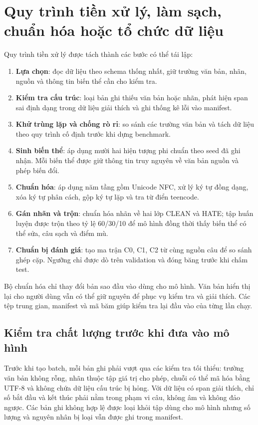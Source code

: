 \documentclass[12pt,a4paper]{article}
\begin{document}
\section{Quy trình tiền xử lý, làm sạch, chuẩn hóa hoặc tổ chức dữ liệu}
Quy trình tiền xử lý được tách thành các bước có thể tái lập:
\begin{enumerate}
  \item \textbf{Lựa chọn}: đọc dữ liệu theo schema thống nhất, giữ trường văn bản, nhãn, nguồn và thông tin biến thể cần cho kiểm tra.
  \item \textbf{Kiểm tra cấu trúc}: loại bản ghi thiếu văn bản hoặc nhãn, phát hiện span sai định dạng trong dữ liệu giải thích và ghi thống kê lỗi vào manifest.
  \item \textbf{Khử trùng lặp và chống rò rỉ}: so sánh các trường văn bản và tách dữ liệu theo quy trình cố định trước khi dựng benchmark.
  \item \textbf{Sinh biến thể}: áp dụng mười hai hiện tượng phi chuẩn theo seed đã ghi nhận. Mỗi biến thể được giữ thông tin truy nguyên về văn bản nguồn và phép biến đổi.
  \item \textbf{Chuẩn hóa}: áp dụng năm tầng gồm Unicode NFC, xử lý ký tự đồng dạng, xóa ký tự phân cách, gộp ký tự lặp và tra từ điển teencode.
  \item \textbf{Gán nhãn và trộn}: chuẩn hóa nhãn về hai lớp CLEAN và HATE; tập huấn luyện được trộn theo tỷ lệ 60/30/10 để mô hình đồng thời thấy biến thể có thể sửa, câu sạch và điểm mù.
  \item \textbf{Chuẩn bị đánh giá}: tạo ma trận C0, C1, C2 từ cùng nguồn câu để so sánh ghép cặp. Ngưỡng chỉ được dò trên validation và đóng băng trước khi chấm test.
\end{enumerate}

Bộ chuẩn hóa chỉ thay đổi bản sao đầu vào dùng cho mô hình. Văn bản hiển thị lại cho người dùng vẫn có thể giữ nguyên để phục vụ kiểm tra và giải thích. Các tệp trung gian, manifest và mã băm giúp kiểm tra lại đầu vào của từng lần chạy.

\subsection{Kiểm tra chất lượng trước khi đưa vào mô hình}
Trước khi tạo batch, mỗi bản ghi phải vượt qua các kiểm tra tối thiểu: trường văn bản không rỗng, nhãn thuộc tập giá trị cho phép, chuỗi có thể mã hóa bằng UTF-8 và không chứa dữ liệu cấu trúc bị hỏng. Với dữ liệu có span giải thích, chỉ số bắt đầu và kết thúc phải nằm trong phạm vi câu, không âm và không đảo ngược. Các bản ghi không hợp lệ được loại khỏi tập dùng cho mô hình nhưng số lượng và nguyên nhân bị loại vẫn được ghi trong manifest.
\end{document}
